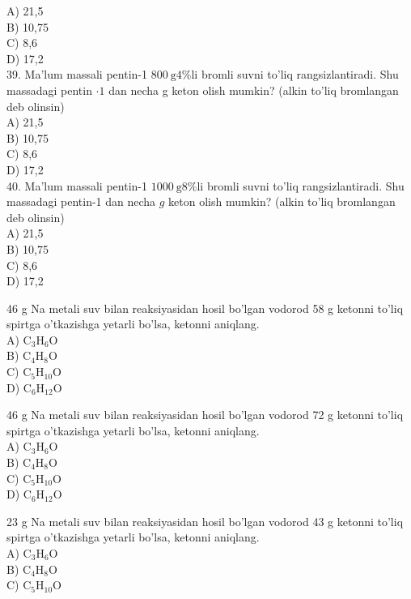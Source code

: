 A) 21,5\\
B) 10,75\\
C) 8,6\\
D) 17,2\\
39. Ma'lum massali pentin-1 $800 \mathrm{~g} 4 \% \mathrm{li}$ bromli suvni to'liq rangsizlantiradi. Shu massadagi pentin $\cdot 1$ dan necha g keton olish mumkin? (alkin to'liq bromlangan deb olinsin)\\
A) 21,5\\
B) 10,75\\
C) 8,6\\
D) 17,2\\
40. Ma'lum massali pentin-1 $1000 \mathrm{~g} 8 \% \mathrm{li}$ bromli suvni to'liq rangsizlantiradi. Shu massadagi pentin-1 dan necha $g$ keton olish mumkin? (alkin to'liq bromlangan deb olinsin)\\
A) 21,5\\
B) 10,75\\
C) 8,6\\
D) 17,2
  \item 46 g Na metali suv bilan reaksiyasidan hosil bo'lgan vodorod 58 g ketonni to'liq spirtga o'tkazishga yetarli bo'lsa, ketonni aniqlang.\\
A) $\mathrm{C}_{3} \mathrm{H}_{6} \mathrm{O}$\\
B) $\mathrm{C}_{4} \mathrm{H}_{8} \mathrm{O}$\\
C) $\mathrm{C}_{5} \mathrm{H}_{10} \mathrm{O}$\\
D) $\mathrm{C}_{6} \mathrm{H}_{12} \mathrm{O}$
  \item 46 g Na metali suv bilan reaksiyasidan hosil bo'lgan vodorod 72 g ketonni to'liq spirtga o'tkazishga yetarli bo'lsa, ketonni aniqlang.\\
A) $\mathrm{C}_{3} \mathrm{H}_{6} \mathrm{O}$\\
B) $\mathrm{C}_{4} \mathrm{H}_{8} \mathrm{O}$\\
C) $\mathrm{C}_{5} \mathrm{H}_{10} \mathrm{O}$\\
D) $\mathrm{C}_{6} \mathrm{H}_{12} \mathrm{O}$
  \item 23 g Na metali suv bilan reaksiyasidan hosil bo'lgan vodorod 43 g ketonni to'liq spirtga o'tkazishga yetarli bo'lsa, ketonni aniqlang.\\
A) $\mathrm{C}_{3} \mathrm{H}_{6} \mathrm{O}$\\
B) $\mathrm{C}_{4} \mathrm{H}_{8} \mathrm{O}$\\
C) $\mathrm{C}_{5} \mathrm{H}_{10} \mathrm{O}$\\
